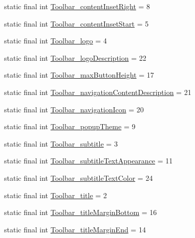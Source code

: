 \begin{DoxyCompactItemize}
\item 
static final int \hyperlink{classcheck_1_1test_1_1_r_1_1styleable_a03f33bda55e3dc7f0e54ed0c302c497e}{Toolbar\+\_\+content\+Inset\+Right} = 8
\item 
static final int \hyperlink{classcheck_1_1test_1_1_r_1_1styleable_a9dae7a4f6dfee5c810df77ff15242164}{Toolbar\+\_\+content\+Inset\+Start} = 5
\item 
static final int \hyperlink{classcheck_1_1test_1_1_r_1_1styleable_a42f433954d5c39edb50f485b83d4bfbd}{Toolbar\+\_\+logo} = 4
\item 
static final int \hyperlink{classcheck_1_1test_1_1_r_1_1styleable_aa33122c1e3e1e09c60ff7a33506a08d8}{Toolbar\+\_\+logo\+Description} = 22
\item 
static final int \hyperlink{classcheck_1_1test_1_1_r_1_1styleable_a2a04c6b8bb844f8f793cb6990bd70a78}{Toolbar\+\_\+max\+Button\+Height} = 17
\item 
static final int \hyperlink{classcheck_1_1test_1_1_r_1_1styleable_ad99d197ecf766148183b75964c1fcb43}{Toolbar\+\_\+navigation\+Content\+Description} = 21
\item 
static final int \hyperlink{classcheck_1_1test_1_1_r_1_1styleable_a991bcba8e01110fe04b1c4f26bbfccc9}{Toolbar\+\_\+navigation\+Icon} = 20
\item 
static final int \hyperlink{classcheck_1_1test_1_1_r_1_1styleable_a731a060d7a21c9b47869e797b622fce9}{Toolbar\+\_\+popup\+Theme} = 9
\item 
static final int \hyperlink{classcheck_1_1test_1_1_r_1_1styleable_a8215e68d4a9819e686f4e4bbe6f2faef}{Toolbar\+\_\+subtitle} = 3
\item 
static final int \hyperlink{classcheck_1_1test_1_1_r_1_1styleable_a144e9a2b2baf47ad3bc709462b1a5bbb}{Toolbar\+\_\+subtitle\+Text\+Appearance} = 11
\item 
static final int \hyperlink{classcheck_1_1test_1_1_r_1_1styleable_ac4cc2a3f74200eb561317a2f73280838}{Toolbar\+\_\+subtitle\+Text\+Color} = 24
\item 
static final int \hyperlink{classcheck_1_1test_1_1_r_1_1styleable_a10fa1bd14d7aa843ac28da6df2e66b54}{Toolbar\+\_\+title} = 2
\item 
static final int \hyperlink{classcheck_1_1test_1_1_r_1_1styleable_a5e6ae0606eec219fca6a04beab67b4b3}{Toolbar\+\_\+title\+Margin\+Bottom} = 16
\item 
static final int \hyperlink{classcheck_1_1test_1_1_r_1_1styleable_a17f1cea527896f8c82a64142d730f2bc}{Toolbar\+\_\+title\+Margin\+End} = 14
\item 

\end{DoxyCompactItemize}

